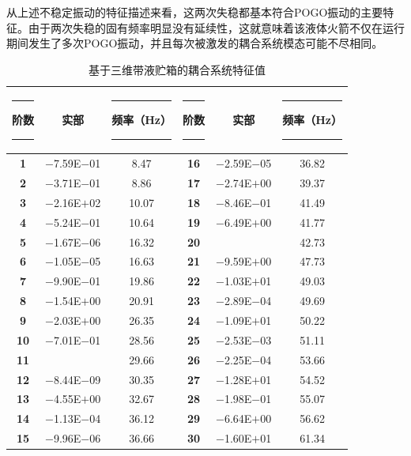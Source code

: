 从上述不稳定振动的特征描述来看，这两次失稳都基本符合POGO振动的主要特征。由于两次失稳的固有频率明显没有延续性，这就意味着该液体火箭不仅在运行期间发生了多次POGO振动，并且每次被激发的耦合系统模态可能不尽相同。

\setcounter{footnote}{0}
\begin{table}[tb]
	\renewcommand{\arraystretch}{1.5}
	\centering
	\caption{基于三维带液贮箱的耦合系统特征值}
	\label{table:3D-Rocket-EigenValue}
	\begin{tabular}{cccccc}
	\toprule
	\rule{8pt}{0ex}阶数\rule{8pt}{0ex} & 实部 & \rule{8pt}{0ex}频率（\si{\Hz}）\rule{8pt}{0ex} & \rule{8pt}{0ex}阶数\rule{8pt}{0ex} & 实部 & \rule{8pt}{0ex} 频率（\si{\Hz}）\rule{8pt}{0ex} \\ \midrule
	\textbf{1 } & $-$7.59E$-$01 & 8.47  & \textbf{16} & $-$2.59E$-$05 & 36.82 \\
	\textbf{2 } & $-$3.71E$-$01 & 8.86  & \textbf{17} & $-$2.74E$+$00 & 39.37 \\
	\textbf{3 } & $-$2.16E$+$02 & 10.07 & \textbf{18} & $-$8.46E$-$01 & 41.49 \\
	\textbf{4 } & $-$5.24E$-$01 & 10.64 & \textbf{19} & $-$6.49E$+$00 & 41.77 \\
	\textbf{5 } & $-$1.67E$-$06 & 16.32 & \textbf{20} & \framebox{\textcolor{red}{$+$2.99E$-$01}} & 42.73 \\
	\textbf{6 } & $-$1.05E$-$05 & 16.63 & \textbf{21} & $-$9.59E$+$00 & 47.73 \\
	\textbf{7 } & $-$9.90E$-$01 & 19.86 & \textbf{22} & $-$1.03E$+$01 & 49.03 \\
	\textbf{8 } & $-$1.54E$+$00 & 20.91 & \textbf{23} & $-$2.89E$-$04 & 49.69 \\
	\textbf{9 } & $-$2.03E$+$00 & 26.35 & \textbf{24} & $-$1.09E$+$01 & 50.22 \\
	\textbf{10} & $-$7.01E$-$01 & 28.56 & \textbf{25} & $-$2.53E$-$03 & 51.11 \\
	\textbf{11} & \framebox{\textcolor{red}{$+$1.21E$-$06}} & 29.66 & \textbf{26} & $-$2.25E$-$04 & 53.66 \\
	\textbf{12} & $-$8.44E$-$09 & 30.35 & \textbf{27} & $-$1.28E$+$01 & 54.52 \\
	\textbf{13} & $-$4.55E$+$00 & 32.67 & \textbf{28} & $-$1.98E$-$01 & 55.07 \\
	\textbf{14} & $-$1.13E$-$04 & 36.12 & \textbf{29} & $-$6.64E$+$00 & 56.62 \\
	\textbf{15} & $-$9.96E$-$06 & 36.66 & \textbf{30} & $-$1.60E$+$01 & 61.34 \\
	\bottomrule
	\end{tabular}
\end{table}

